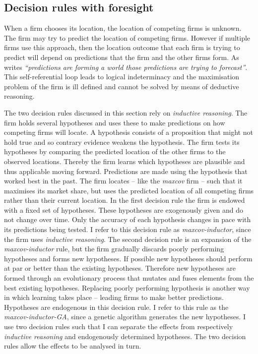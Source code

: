 \documentclass[preprint, 12pt]{elsarticle}
\begin{document}
\subsection{Decision rules with foresight}
\label{sec:foresight}

When a firm chooses its location, the location of competing firms is unknown. The firm may try to predict the location of competing firms. However if multiple firms use this approach, then the location outcome that each firm is trying to predict will depend on predictions that the firm and the other firms form. As \citet[p.~175]{Arthur_2014} writes \emph{``predictions are forming a world those predictions are trying to forecast''}. This self-referential loop leads to logical indeterminacy and the maximisation problem of the firm is ill defined and cannot be solved by means of deductive reasoning. 

The two decision rules discussed in this section rely on \emph{inductive reasoning}. The firm holds several hypotheses and uses these to make predictions on how competing firms will locate. A hypothesis consists of a proposition that might not hold true and so contrary evidence weakens the hypothesis. The firm tests its hypotheses by comparing the predicted location of the other firms to the observed locations. Thereby the firm learns which hypotheses are plausible and thus applicable moving forward. Predictions are made using the hypothesis that worked best in the past. The firm locates -- like the \emph{maxcov} firm -- such that it maximises its market share, but uses the predicted location of all competing firms rather than their current location. In the first decision rule the firm is endowed with a fixed set of hypotheses. These hypotheses are exogenously given and do not change over time. Only the accuracy of each hypothesis changes in pace with its predictions being tested. I refer to this decision rule as \emph{maxcov-inductor}, since the firm uses \emph{inductive reasoning}. The second decision rule is an expansion of the \emph{maxcov-inductor} rule, but the firm gradually discards poorly performing hypotheses and forms new hypotheses. If possible new hypotheses should perform at par or better than the existing hypotheses. Therefore new hypotheses are formed through an evolutionary process that mutates and fuses elements from the best existing hypotheses. Replacing poorly performing hypothesis is another way in which learning takes place -- leading firms to make better predictions. Hypotheses are endogenous in this decision rule. I refer to this rule as the \emph{maxcov-inductor-GA}, since a genetic algorithm generates the new hypotheses. I use two decision rules such that I can separate the effects from respectively \emph{inductive reasoning} and endogenously determined hypotheses. The two decision rules allow the effects to be analysed in turn.
\end{document}
